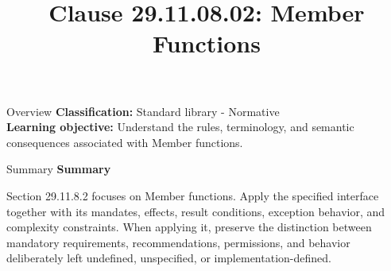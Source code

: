 \documentclass[10pt,letterpaper]{article}
\title{Clause 29.11.08.02: Member Functions}
\author{}
\date{}
\begin{document}
\maketitle
\begin{CornellOverviewBox}{Overview}
\textbf{Classification:} Standard library - Normative\\[2pt]
\textbf{Learning objective:} Understand the rules, terminology, and semantic consequences associated with Member functions.
\end{CornellOverviewBox}\begin{CornellSummaryBox}{Summary}
{\sffamily\bfseries\color{Accent} Summary}\par\vspace{3pt}Section 29.11.8.2 focuses on Member functions. Apply the specified interface together with its mandates, effects, result conditions, exception behavior, and complexity constraints. When applying it, preserve the distinction between mandatory requirements, recommendations, permissions, and behavior deliberately left undefined, unspecified, or implementation-defined.
\end{CornellSummaryBox}
\end{document}
